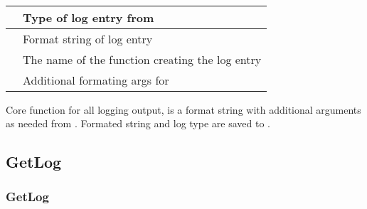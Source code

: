 \documentclass[letterpaper,10pt,english]{sphinxmanual}
\begin{document}
\begin{fulllineitems}
\label{\detokenize{log:_CPPv2N6pessum3LogEiNSt6stringENSt6stringEz}}%
\pysigstartmultiline
{}%
\pysigstopmultiline~

\begin{savenotes}\sphinxattablestart
\centering
\begin{tabulary}{\linewidth}[t]{|T|T|}
\hline

&
Type of log entry from {\hyperref[\detokenize{log:_CPPv2N6pessum7LogTypeE}]{}}
\\
\hline
{}
&
Format string of log entry
\\
\hline
{}
&
The name of the function creating the log entry
\\
\hline
{}
&
Additional formating args for 
\\
\hline
\end{tabulary}
\par
\sphinxattableend\end{savenotes}

Core function for all logging output,  is a format string with
additional arguments as needed from . Formated string and log type
are saved to {\hyperref[\detokenize{log:_CPPv2N6pessum11global_logsE}]{}}.

\end{fulllineitems}



\subsection{GetLog}
\label{\detokenize{log:getlog}}

\subsubsection{GetLog}
\label{\detokenize{log:id1}}
\end{document}
